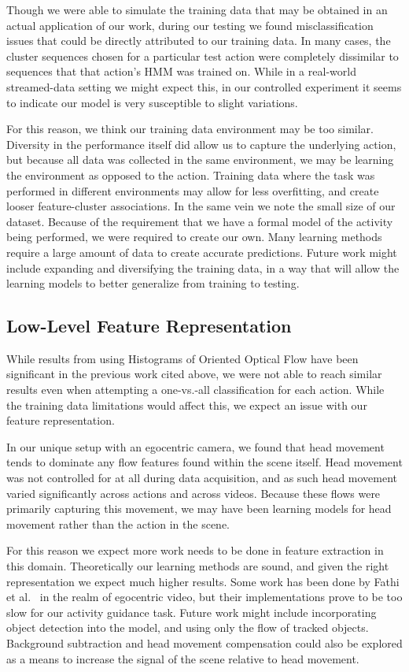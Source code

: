 \documentclass[10pt,twocolumn,letterpaper]{article}
\begin{document}
Though we were able to simulate the training data that may be obtained in an actual application of our work, during our testing we found misclassification issues that could be directly attributed to our training data. In many cases, the cluster sequences chosen for a particular test action were completely dissimilar to sequences that that action's HMM was trained on. While in a real-world streamed-data setting we might expect this, in our controlled experiment it seems to indicate our model is very susceptible to slight variations.

For this reason, we think our training data environment may be too similar. Diversity in the performance itself did allow us to capture the underlying action, but because all data was collected in the same environment, we may be learning the environment as opposed to the action. Training data where the task was performed in different environments may allow for less overfitting, and create looser feature-cluster associations. In the same vein we note the small size of our dataset. Because of the requirement that we have a formal model of the activity being performed, we were required to create our own. Many learning methods require a large amount of data to create accurate predictions. Future work might include expanding and diversifying the training data, in a way that will allow the learning models to better generalize from training to testing.

\subsection{Low-Level Feature Representation}

While results from using Histograms of Oriented Optical Flow have been significant in the previous work cited above, we were not able to reach similar results even when attempting a one-vs.-all classification for each action. While the training data limitations would affect this, we expect an issue with our feature representation.

In our unique setup with an egocentric camera, we found that head movement tends to dominate any flow features found within the scene itself. Head movement was not controlled for at all during data acquisition, and as such head movement varied significantly across actions and across videos. Because these flows were primarily capturing this movement, we may have been learning models for head movement rather than the action in the scene.

For this reason we expect more work needs to be done in feature extraction in this domain. Theoretically our learning methods are sound, and given the right representation we expect much higher results. Some work has been done by Fathi et al.~\cite{fathi2011understanding} in the realm of egocentric video, but their implementations prove to be too slow for our activity guidance task. Future work might include incorporating object detection into the model, and using only the flow of tracked objects. Background subtraction and head movement compensation could also be explored as a means to increase the signal of the scene relative to head movement.
 
\end{document}
